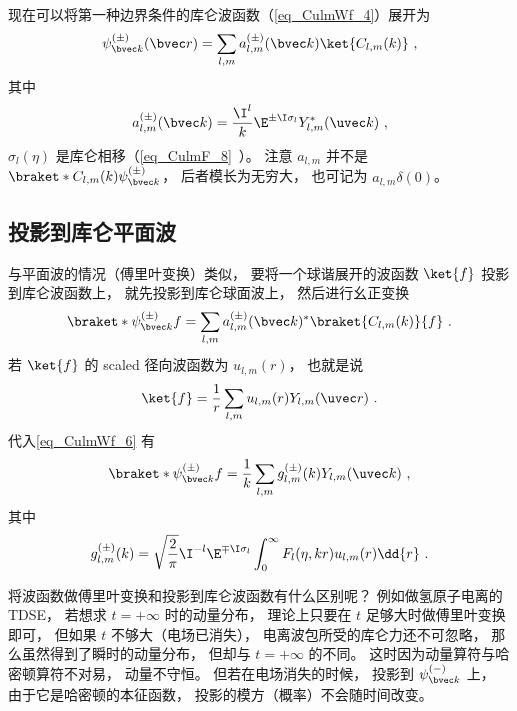 现在可以将第一种边界条件的库仑波函数（\autoref{eq_CulmWf_4}）展开为
\begin{equation}\label{eq_CulmWf_9}
\psi_{\bvec k}^{(\pm)}(\bvec r) =  \sum_{l,m} a_{l,m}^{(\pm)}(\bvec k) \ket{C_{l,m}(k)}~,
\end{equation}
其中
\begin{equation}\label{eq_CulmWf_10}
a_{l,m}^{(\pm)}(\bvec k) = \frac{\I^l}{k} \E^{\pm\I\sigma_l} Y_{l,m}^* (\uvec k)~,
\end{equation}
$\sigma_l(\eta)$ 是库仑相移（\autoref{eq_CulmF_8}~）。 注意 $a_{l,m}$ 并不是 $\braket*{C_{l,m}(k)}{\psi_{\bvec k}^{(\pm)}}$， 后者模长为无穷大， 也可记为 $a_{l,m}\delta(0)$。

\subsection{投影到库仑平面波}
与平面波的情况（傅里叶变换）类似， 要将一个球谐展开的波函数 $\ket{f}$ 投影到库仑波函数上， 就先投影到库仑球面波上， 然后进行幺正变换
\begin{equation}\label{eq_CulmWf_6}
\braket*{\psi_{\bvec k}^{(\pm)}}{f} = \sum_{l,m}  a_{l,m}^{(\pm)}(\bvec k)^* \braket{C_{l,m}(k)}{f}~.
\end{equation}
若 $\ket{f}$ 的 scaled 径向波函数为 $u_{l,m}(r)$， 也就是说
\begin{equation}
\ket{f} = \frac{1}{r}\sum_{l,m}u_{l,m}(r) Y_{l,m}(\uvec r)~.
\end{equation}
代入\autoref{eq_CulmWf_6} 有
\begin{equation}\label{eq_CulmWf_3}
\braket*{\psi_{\bvec k}^{(\pm)}}{f} = \frac{1}{k} \sum_{l,m} g_{l,m}^{(\pm)}(k) Y_{l,m}(\uvec k)~,
\end{equation}
其中
\begin{equation}\label{eq_CulmWf_8}
g_{l,m}^{(\pm)}(k) = \sqrt{\frac{2}{\pi}} \I^{-l} \E^{\mp\I\sigma_l} \int_0^\infty F_l(\eta, kr) u_{l,m}(r) \dd{r}~.
\end{equation}

将波函数做傅里叶变换和投影到库仑波函数有什么区别呢？ 例如做氢原子电离的 TDSE， 若想求 $t = +\infty$ 时的动量分布， 理论上只要在 $t$ 足够大时做傅里叶变换即可， 但如果 $t$ 不够大（电场已消失）， 电离波包所受的库仑力还不可忽略， 那么虽然得到了瞬时的动量分布， 但却与 $t = +\infty$ 的不同。 这时因为动量算符与哈密顿算符不对易， 动量不守恒。 但若在电场消失的时候， 投影到 $\psi_{\bvec k}^{(-)}$ 上， 由于它是哈密顿的本征函数， 投影的模方（概率）不会随时间改变。

